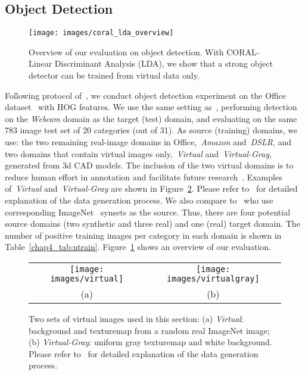 \documentclass[graybox]{svmult}
\begin{document}
\subsection{Object Detection}
\label{subsec:coral-lda}

\begin{figure}[b]
\centering
\texttt{[image: images/coral\_lda\_overview]}
\caption{\small Overview of our evaluation on object detection. With CORAL-Linear Discriminant Analysis (LDA), we show that a strong object detector can be trained from virtual data only.}
\label{chap4_fig:overview}
\end{figure}

Following protocol of~\cite{ICRA14}, we conduct object detection experiment on the Office dataset~\cite{saenko2010adapting} with HOG features. We use the same setting as~\cite{ICRA14}, performing detection on the \textit{Webcam} domain as the target (test) domain, and evaluating on the same 783 image test set of 20 categories (out of 31). As source (training) domains, we use: the two remaining real-image domains in Office,~\textit{Amazon} and~\textit{DSLR}, and two domains that contain virtual images only,~\textit{Virtual} and~\textit{Virtual-Gray}, generated from 3d CAD models. The inclusion of the two virtual domains is to reduce human effort in annotation and facilitate future research~\cite{sun16phdthesis}. Examples of~\textit{Virtual} and~\textit{Virtual-Gray} are shown in Figure~\ref{chap4_fig:virtual_data}. Please refer to~\cite{sun15virtualdataset} for detailed explanation of the data generation process.
We also compare to~\cite{ICRA14} who use corresponding ImageNet~\cite{imagenet} synsets as the source.
Thus, there are four potential source domains (two synthetic and three real) and one (real) target domain. The number of positive training images per category in each domain is shown in Table~\ref{chap4_tab:ntrain}. Figure~\ref{chap4_fig:overview} shows an overview of our evaluation.

\begin{figure}
\centering
\begin{tabular}{cc}
\texttt{[image: images/virtual]} 
\hspace{\fill} &
\texttt{[image: images/virtualgray]} \\
(a)&(b)
\end{tabular}
\caption{\small Two sets of virtual images used in this section: (a) \textit{Virtual}: background and texturemap from a random real ImageNet image; (b) \textit{Virtual-Gray}:  uniform gray texturemap and white background. Please refer to~\cite{sun15virtualdataset} for detailed explanation of the data generation process.}
\label{chap4_fig:virtual_data}
\end{figure}
\end{document}

